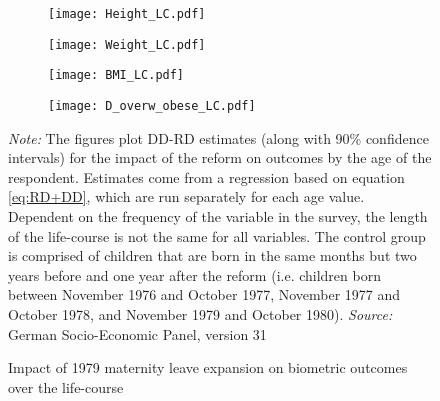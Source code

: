 \documentclass[a4paper ]{article}
\begin{document}
\clearpage
\newpage
\begin{figure}[p]
\begin{subfigure}[h]{0.48\textwidth}\centering
	\texttt{[image: Height\_LC.pdf]}
\end{subfigure}
\quad
\begin{subfigure}[h]{0.48\textwidth}\centering
	\texttt{[image: Weight\_LC.pdf]}
\end{subfigure}

\begin{subfigure}[h]{0.48\textwidth}\centering
	\texttt{[image: BMI\_LC.pdf]}
\end{subfigure}
\quad
\begin{subfigure}[h]{0.48\textwidth}\centering
	\texttt{[image: D\_overw\_obese\_LC.pdf]}
\end{subfigure}
\caption{Impact of 1979 maternity leave expansion on biometric outcomes over the life-course}\label{fig: LC_BM}
\begin{minipage}{\textwidth} %
{\footnotesize \textit{Note:} The figures plot DD-RD estimates (along with 90\% confidence intervals) for the impact of the reform on outcomes by the age of the respondent. Estimates come from a regression based on equation \ref{eq:RD+DD}, which are run separately for each age value. Dependent on the frequency of the variable in the survey, the length of the life-course is not the same for all variables. The control group is comprised of children that are born in the same months but two years before and one year after the reform (i.e. children born between November 1976 and October 1977, November 1977 and October 1978, and November 1979 and October 1980).  \newline \textit{Source: }German Socio-Economic Panel, version 31\par}
\end{minipage}
\end{figure}
\newpage
\end{document}
